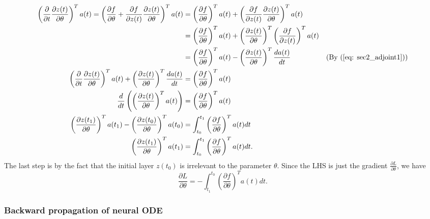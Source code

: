 \begin{align*}
    \left(\frac{\partial}{\partial t}\frac{\partial z(t)}{\partial\theta}\right)^Ta(t) = \left(\frac{\partial f}{\partial \theta}+\frac{\partial f}{\partial z(t)}\frac{\partial z(t)}{\partial \theta}\right)^Ta(t) &= \left(\frac{\partial f}{\partial \theta}\right)^Ta(t)+ \left(\frac{\partial f}{\partial z(t)}\frac{\partial z(t)}{\partial \theta}\right)^Ta(t) \\
                                                                                       &= \left(\frac{\partial f}{\partial \theta}\right)^Ta(t)+\left(\frac{\partial z(t)}{\partial \theta}\right)^T\left(\frac{\partial f}{\partial z(t)}\right)^Ta(t) \\
                                                                                       &= \left(\frac{\partial f}{\partial \theta}\right)^Ta(t) - \left(\frac{\partial z(t)}{\partial \theta}\right)^T\frac{da(t)}{dt} & (\text{By (\ref{eq: sec2_adjoint1})}) \\
    \left(\frac{\partial}{\partial t}\frac{\partial z(t)}{\partial\theta}\right)^Ta(t) + \left(\frac{\partial z(t)}{\partial \theta}\right)^T\frac{da(t)}{dt} &= \left(\frac{\partial f}{\partial \theta}\right)^Ta(t) \\
    \frac{d}{dt}\left(\left(\frac{\partial z(t)}{\partial\theta}\right)^Ta(t)\right) &= \left(\frac{\partial f}{\partial \theta}\right)^Ta(t) \\
    \left(\frac{\partial z(t_1)}{\partial\theta}\right)^Ta(t_1) - \left(\frac{\partial z(t_0)}{\partial\theta}\right)^Ta(t_0) &= \int_{t_0}^{t_1}\left(\frac{\partial f}{\partial \theta}\right)^Ta(t)dt \\
    \left(\frac{\partial z(t_1)}{\partial\theta}\right)^Ta(t_1) &= \int_{t_0}^{t_1}\left(\frac{\partial f}{\partial \theta}\right)^Ta(t)dt. 
\end{align*}
The last step is by the fact that the initial layer $z(t_0)$ is irrelevant to the parameter $\theta$.  
Since the LHS is just the gradient $\frac{\partial L}{\partial \theta}$, 
we have 
\begin{equation*}
    \frac{\partial L}{\partial \theta} = -\int_{t_1}^{t_0}\left(\frac{\partial f}{\partial \theta}\right)^Ta(t)dt. 
\end{equation*}

\subsubsection{Backward propagation of neural ODE}

